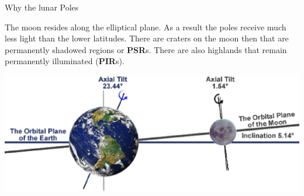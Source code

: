\documentclass{beamer}
\begin{document}
\begin{frame}{Why the lunar Poles}
 
 The moon resides along the elliptical plane. As a result the poles receive much less light than the lower latitudes. There are craters on the moon then that are permanently shadowed regions or \textbf{PSR}s. There are also highlands that remain permanently illuminated (\textbf{PIR}s).
 \begin{center}
             \includegraphics[width= 1\textwidth]{earth-moon.eps}   
      \end{center}  
\end{frame}



%
\end{document}
